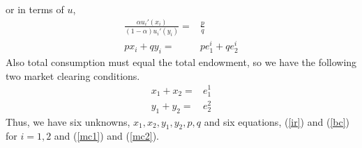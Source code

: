 or in terms of $u$,
\begin{align}
  \frac{ \alpha u_i'(x_i) }{ (1-\alpha) u_i'(y_i) } = &
  \frac{p}{q} \label{ir} \\ 
  p x_i + q y_i = &  p e_1^i + q e_2^i \label{bc}
\end{align}
Also total consumption must equal the total endowment, so we have the
following two market clearing conditions.
\begin{align}
  x_1 + x_2 = & e_1^1 \label{mc1} \\ 
  y_1 + y_2 = & e_2^2 \label{mc2}
\end{align}
Thus, we have six unknowns, $x_1, x_2, y_1, y_2, p, q$ and six
equations, (\ref{ir}) and (\ref{bc}) for $i=1,2$ and (\ref{mc1}) and
(\ref{mc2}). 